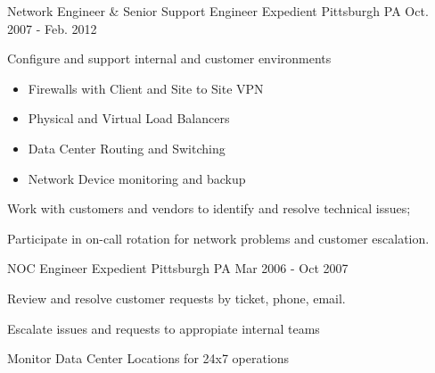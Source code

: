 \begin{cventries}

\cventry
{Network Engineer \& Senior Support Engineer} %
{Expedient} %
{Pittsburgh PA} %
{Oct. 2007 - Feb. 2012} %
{ %
\begin{cvitems}
\item Configure and support internal and customer environments
  \begin{itemize}%
  \item Firewalls with Client and Site to Site VPN
  \item Physical and Virtual Load Balancers
  \item Data Center Routing and Switching
  \item Network Device monitoring and backup
  \end{itemize}
\item Work with customers and vendors to identify and resolve technical issues;
\item Participate in on-call rotation for network problems and customer escalation.
\end{cvitems} 
}


\cventry
{NOC Engineer} %
{Expedient} %
{Pittsburgh PA} %
{Mar 2006 - Oct 2007} %
{ %
\begin{cvitems}
\item Review and resolve customer requests by ticket, phone, email.
\item Escalate issues and requests to appropiate internal teams
\item Monitor Data Center Locations for 24x7 operations
\end{cvitems}
}

\end{cventries}

